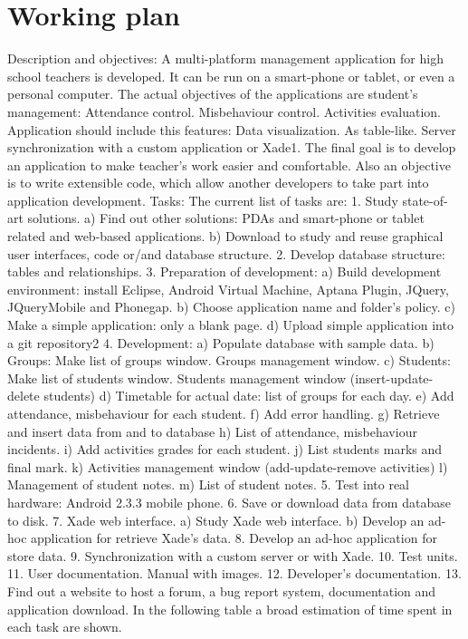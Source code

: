 \chapter{Working plan}

Description and objectives:
	A multi-platform management application for high school teachers is developed. It can be run on a smart-phone or tablet, or even a personal computer. 
	The actual objectives of the applications are student's management:
Attendance control.
Misbehaviour control.
Activities evaluation.
	Application should include this features:
Data visualization. As table-like.
Server synchronization with a custom application or Xade1.
	The final goal is to develop an application to make teacher's work easier and comfortable. Also an objective is to write extensible code, which allow another developers to take part into application development.
Tasks:
	The current list of tasks are:
 1. Study state-of-art solutions. 
 a) Find out other solutions: PDAs and smart-phone or tablet related and web-based applications.
 b) Download to study and reuse graphical user interfaces, code or/and database structure. 
 2. Develop database structure: tables and relationships. 
 3. Preparation of development:
 a) Build development environment: install Eclipse, Android Virtual Machine, Aptana Plugin, JQuery, JQueryMobile and Phonegap.
 b) Choose application name and folder's policy.
 c) Make a simple application: only a blank page.
 d) Upload simple application into a git repository2
 4. Development:
 a) Populate database with sample data.
 b) Groups:
Make list of groups window.
Groups management window.
 c) Students:
Make list of students window.
Students management window (insert-update-delete students)
 d) Timetable for actual date: list of groups for each day.
 e) Add attendance, misbehaviour for each student.
 f) Add error handling.
 g) Retrieve and insert data from and to database
 h) List of attendance, misbehaviour incidents.
 i) Add activities grades for each student.
 j) List students marks and final mark.
 k) Activities management window (add-update-remove activities)
 l) Management of student notes.
 m) List of student notes. 
 5. Test into real hardware: Android 2.3.3 mobile phone.
 6. Save or download data from database to disk.
 7. Xade web interface.
 a) Study Xade web interface.
 b) Develop an ad-hoc application for retrieve Xade's data. 
 8. Develop an ad-hoc application for store data. 
 9. Synchronization with a custom server or with Xade.
 10. Test units.
 11. User documentation. Manual with images.
 12. Developer's documentation.
 13. Find out a website to host a forum, a bug report system,  documentation and application download.
In the following table a broad estimation of time spent in each task are shown.  

